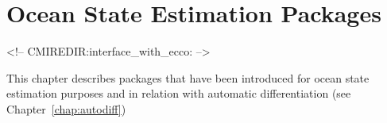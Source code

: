 
\chapter{Ocean State Estimation Packages}
\begin{rawhtml}
<!-- CMIREDIR:interface_with_ecco: -->
\end{rawhtml}
\label{chap.ecco}

This chapter describes packages that have been introduced for ocean state estimation purposes and in relation with automatic differentiation (see Chapter~\ref{chap:autodiff})



\newpage



\newpage



\newpage



\newpage



\newpage


